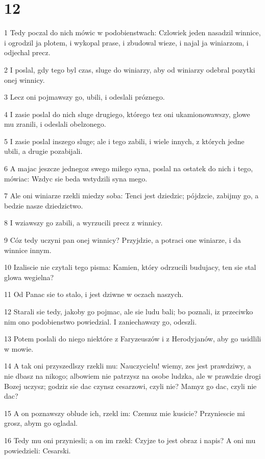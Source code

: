 \chapter{12}

\par 1 Tedy poczal do nich mówic w podobienstwach: Czlowiek jeden nasadzil winnice, i ogrodzil ja plotem, i wykopal prase, i zbudowal wieze, i najal ja winiarzom, i odjechal precz.
\par 2 I poslal, gdy tego byl czas, sluge do winiarzy, aby od winiarzy odebral pozytki onej winnicy.
\par 3 Lecz oni pojmawszy go, ubili, i odeslali próznego.
\par 4 I zasie poslal do nich sluge drugiego, którego tez oni ukamionowawszy, glowe mu zranili, i odeslali obelzonego.
\par 5 I zasie poslal inszego sluge; ale i tego zabili, i wiele innych, z których jedne ubili, a drugie pozabijali.
\par 6 A majac jeszcze jednegoz swego milego syna, poslal na ostatek do nich i tego, mówiac: Wzdyc sie beda wstydzili syna mego.
\par 7 Ale oni winiarze rzekli miedzy soba: Tenci jest dziedzic; pójdzcie, zabijmy go, a bedzie nasze dziedzictwo.
\par 8 I wziawszy go zabili, a wyrzucili precz z winnicy.
\par 9 Cóz tedy uczyni pan onej winnicy? Przyjdzie, a potraci one winiarze, i da winnice innym.
\par 10 Izaliscie nie czytali tego pisma: Kamien, który odrzucili budujacy, ten sie stal glowa wegielna?
\par 11 Od Panac sie to stalo, i jest dziwne w oczach naszych.
\par 12 Starali sie tedy, jakoby go pojmac, ale sie ludu bali; bo poznali, iz przeciwko nim ono podobienstwo powiedzial. I zaniechawszy go, odeszli.
\par 13 Potem poslali do niego niektóre z Faryzeuszów i z Herodyjanów, aby go usidlili w mowie.
\par 14 A tak oni przyszedlszy rzekli mu: Nauczycielu! wiemy, zes jest prawdziwy, a nie dbasz na nikogo; albowiem nie patrzysz na osobe ludzka, ale w prawdzie drogi Bozej uczysz; godziz sie dac czynsz cesarzowi, czyli nie? Mamyz go dac, czyli nie dac?
\par 15 A on poznawszy oblude ich, rzekl im: Czemuz mie kusicie? Przyniescie mi grosz, abym go ogladal.
\par 16 Tedy mu oni przyniesli; a on im rzekl: Czyjze to jest obraz i napis? A oni mu powiedzieli: Cesarski.
